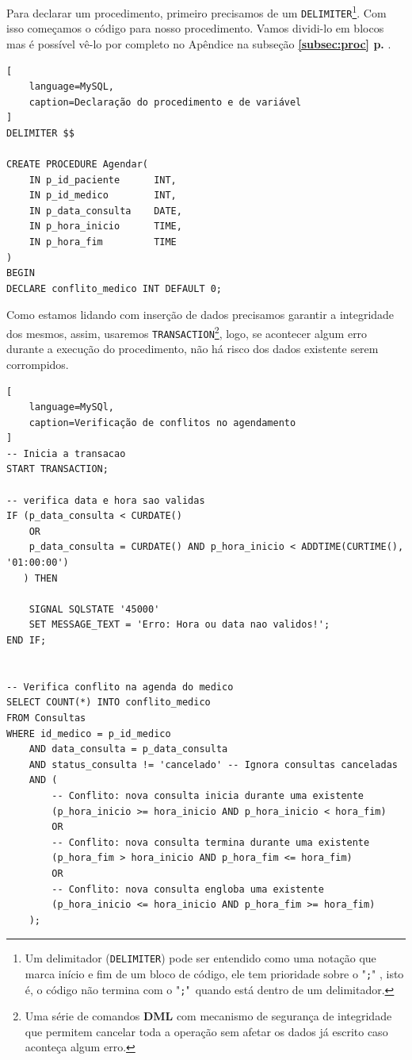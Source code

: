 Para declarar um procedimento, primeiro precisamos de um \texttt{DELIMITER}\footnote{Um delimitador (\texttt{DELIMITER}) pode ser entendido como uma notação que marca início e fim de um bloco de código, ele tem prioridade sobre o "\texttt{;}" , isto é, o código não termina com o "\texttt{;}"\ quando está dentro de um delimitador\cite{Delimiter}.}. Com isso começamos o código para nosso procedimento. Vamos dividi-lo em blocos mas é possível vê-lo por completo no Apêndice na subseção \textbf{\ref{subsec:proc} p. \pageref{subsec:proc}}.

\begin{lstlisting}[
    language=MySQL,
    caption=Declaração do procedimento e de variável
]
DELIMITER $$

CREATE PROCEDURE Agendar(
    IN p_id_paciente      INT,
    IN p_id_medico        INT,
    IN p_data_consulta    DATE,
    IN p_hora_inicio      TIME,
    IN p_hora_fim         TIME
)
BEGIN
DECLARE conflito_medico INT DEFAULT 0; 
\end{lstlisting}

Como estamos lidando com inserção de dados precisamos garantir a integridade dos mesmos, assim, usaremos \texttt{TRANSACTION}\footnote{Uma série de comandos \textbf{DML} com mecanismo de segurança de integridade que permitem cancelar toda a operação sem afetar os dados já escrito caso aconteça algum erro\cite{TRANSACTION}.}, logo, se acontecer algum erro durante a execução do procedimento, não há risco dos dados existente serem corrompidos.

\begin{lstlisting}[
    language=MySQl,
    caption=Verificação de conflitos no agendamento
]
-- Inicia a transacao
START TRANSACTION;

-- verifica data e hora sao validas
IF (p_data_consulta < CURDATE()
    OR
    p_data_consulta = CURDATE() AND p_hora_inicio < ADDTIME(CURTIME(), '01:00:00')
   ) THEN

    SIGNAL SQLSTATE '45000'
    SET MESSAGE_TEXT = 'Erro: Hora ou data nao validos!';
END IF;


-- Verifica conflito na agenda do medico
SELECT COUNT(*) INTO conflito_medico
FROM Consultas
WHERE id_medico = p_id_medico
    AND data_consulta = p_data_consulta
    AND status_consulta != 'cancelado' -- Ignora consultas canceladas
    AND ( 
        -- Conflito: nova consulta inicia durante uma existente
        (p_hora_inicio >= hora_inicio AND p_hora_inicio < hora_fim) 
        OR
        -- Conflito: nova consulta termina durante uma existente  
        (p_hora_fim > hora_inicio AND p_hora_fim <= hora_fim) 
        OR
        -- Conflito: nova consulta engloba uma existente
        (p_hora_inicio <= hora_inicio AND p_hora_fim >= hora_fim)
    );    
\end{lstlisting}

